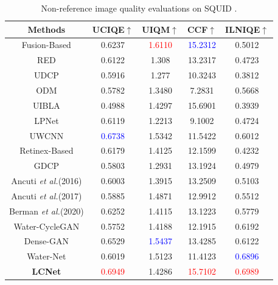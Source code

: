 \documentclass[journal]{IEEEtran}
\begin{document}
\begin{table}[h]
 \caption{Non-reference image quality evaluations on SQUID \cite{berman2020underwater}.}
\centering

\begin{tabular}{|c|c|c|c|c|} 
\hline 
Methods&UCIQE\(\uparrow\)&UIQM\(\uparrow\)&CCF\(\uparrow\)&ILNIQE\(\uparrow\)\\
\hline
Fusion-Based \cite{fusion-based}&0.6237&\textcolor{red}{1.6110}&\textcolor{blue}{15.2312}&0.5012 \\
\hline
RED \cite{RED}&0.6122&1.308&13.2317&0.4723 \\
\hline 
UDCP \cite{UDCP} &0.5916&1.277&10.3243&0.3812 \\
\hline 
ODM \cite{Histogram-prior}&0.5782&1.3480&7.2831&0.5668\\
\hline
UIBLA \cite{blurriness-based}&0.4988&1.4297&15.6901&0.3939\\
\hline
LPNet \cite{fu2019lightweight} &0.6119&1.2213&9.1002&0.4724\\
\hline
UWCNN \cite{uwcnn}&\textcolor{blue}{0.6738}&1.5342&11.5422&0.6012\\
\hline
Retinex-Based \cite{fu2014retinex} &0.6179&1.4125&12.1599&0.4232\\
\hline
GDCP \cite{GDCP}&0.5803 &1.2931&13.1924&0.4979 \\
\hline
Ancuti \textit{et al.}(2016) \cite{ancuti2016multi} &0.6003 &1.3915&13.2509&0.5103 \\
\hline
Ancuti \textit{et al.}(2017) \cite{ancuti2017color} &0.5885 &1.4871&12.9912&0.5512 \\
\hline
Berman \textit{et al.}(2020) \cite{berman2020underwater} &0.6252 &1.4115&13.1223&0.5779 \\
\hline
Water-CycleGAN \cite{water-gan}&0.5752&1.4188&12.1915&0.6192\\
\hline
Dense-GAN \cite{dense-gan} & 0.6529&\textcolor{blue}{1.5437}&13.4285&0.6122\\
\hline
Water-Net \cite{water-net} &0.6019&1.5123&11.4123&\textcolor{blue}{0.6896}
\\
\hline
\textbf{LCNet}&\textcolor{red}{0.6949} &1.4286&\textcolor{red}{15.7102}&\textcolor{red}{0.6989}
\\
\hline 
\end{tabular}
\label{tab5} 
\end{table}
\end{document}
